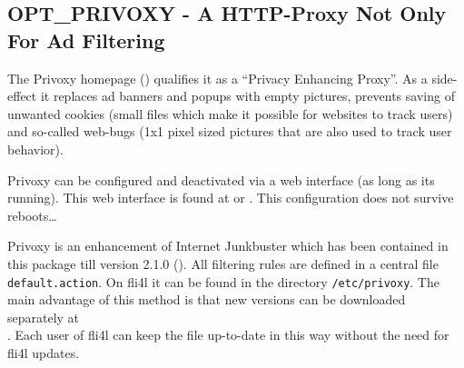 \subsection{OPT\_PRIVOXY - A HTTP-Proxy Not Only For Ad Filtering}

    The Privoxy homepage () qualifies it as a
    ``Privacy Enhancing Proxy''. As a side-effect it replaces ad banners and popups
    with empty pictures, prevents saving of unwanted cookies (small files which make
    it possible for websites to track users) and so-called web-bugs (1x1 pixel sized
    pictures that are also used to track user behavior).

    Privoxy can be configured and deactivated via a web interface (as long as its running).
    This web interface is found at  or .
    This configuration does not survive reboots\ldots

    Privoxy is an enhancement of Internet Junkbuster which has been contained in this
    package till version 2.1.0 ().
    All filtering rules are defined in a central file \texttt{default.action}.
    On fli4l it can be found in the directory \texttt{/etc/privoxy}. The main
    advantage of this method is that new versions can be downloaded separately at\\
    .
    Each user of fli4l can keep the file up-to-date in this way without
    the need for fli4l updates.

